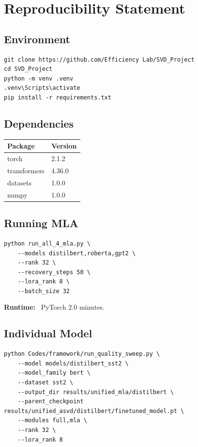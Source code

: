 
\section{Reproducibility Statement}

\subsection{Environment}

\begin{lstlisting}
git clone https://github.com/Efficiency Lab/SVD_Project
cd SVD_Project
python -m venv .venv
.venv\Scripts\activate
pip install -r requirements.txt
\end{lstlisting}

\subsection{Dependencies}

\begin{table}[H]
\centering
\small
\begin{tabular}{ll}
\toprule
\textbf{Package} & \textbf{Version} \\
\midrule
torch & 2.1.2 \\
transformers & 4.36.0 \\
datasets & 1.0.0 \\
numpy & 1.0.0 \\
\bottomrule
\end{tabular}
\end{table}

\subsection{Running MLA}

\begin{lstlisting}
python run_all_4_mla.py \
    --models distilbert,roberta,gpt2 \
    --rank 32 \
    --recovery_steps 50 \
    --lora_rank 8 \
    --batch_size 32
\end{lstlisting}

\textbf{Runtime:} ~PyTorch 2.0 minutes.

\subsection{Individual Model}

\begin{lstlisting}
python Codes/framework/run_quality_sweep.py \
    --model models/distilbert_sst2 \
    --model_family bert \
    --dataset sst2 \
    --output_dir results/unified_mla/distilbert \
    --parent_checkpoint results/unified_asvd/distilbert/finetuned_model.pt \
    --modules full,mla \
    --rank 32 \
    --lora_rank 8
\end{lstlisting}

